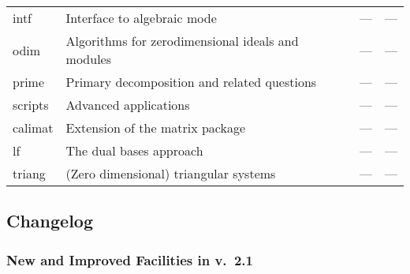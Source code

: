 \begin{tabular}{|p{1.2cm}||>{\raggedright}p{4.5cm}|>{\raggedright}p{1.9cm}|p{3.4cm}|}
intf & Interface to algebraic mode & --- & ---\\

odim & Algorithms for zerodimensional ideals and modules & --- & ---\\

prime & Primary decomposition and related questions & --- & ---\\

scripts & Advanced applications  & --- & ---\\

calimat & Extension of the matrix package & --- & ---\\

lf & The dual bases approach & --- & ---\\

triang & (Zero dimensional) triangular systems & --- & ---\\
\hline
\end{tabular}

\subsection{Changelog}

\subsubsection{New and Improved Facilities in v.~2.1}

